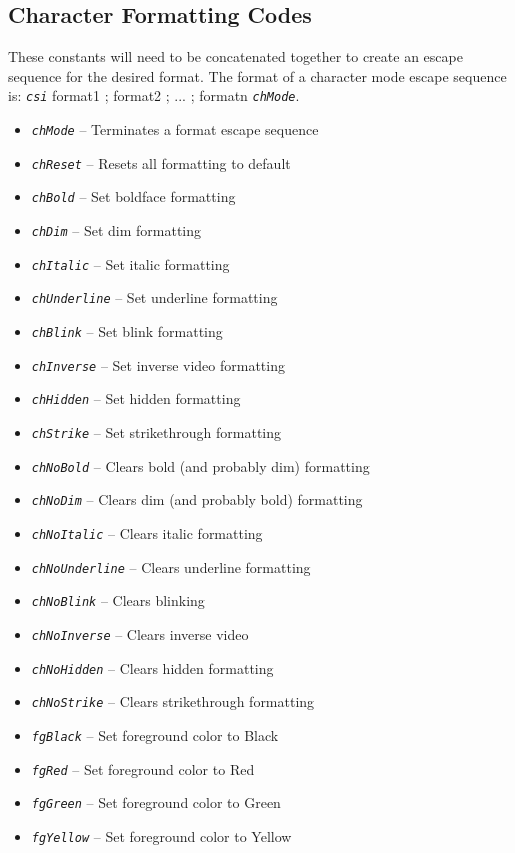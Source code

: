 \documentclass[10pt, openany]{book}
\newcommand{\constant}[1]{\emph{\texttt{#1}}}
\begin{document}
\subsection{Character Formatting Codes}
These constants will need to be concatenated together to create an escape sequence for the desired format.  The format of a character mode escape sequence is:
  \constant{csi} format1 ; format2 ; ... ; formatn \constant{chMode}.
  \begin{itemize}
    \item \constant{chMode} -- Terminates a format escape sequence
  \item \constant{chReset} -- Resets all formatting to default
  \item \constant{chBold} -- Set boldface formatting
  \item \constant{chDim} -- Set dim formatting
  \item \constant{chItalic} -- Set italic formatting
  \item \constant{chUnderline} -- Set underline formatting
  \item \constant{chBlink} -- Set blink formatting
  \item \constant{chInverse} -- Set inverse video formatting
  \item \constant{chHidden} -- Set hidden formatting
  \item \constant{chStrike} -- Set strikethrough formatting
  \item \constant{chNoBold} -- Clears bold (and probably dim) formatting
  \item \constant{chNoDim} -- Clears dim (and probably bold) formatting
  \item \constant{chNoItalic} -- Clears italic formatting
  \item \constant{chNoUnderline} -- Clears underline formatting
  \item \constant{chNoBlink} -- Clears blinking
  \item \constant{chNoInverse} -- Clears inverse video
  \item \constant{chNoHidden} -- Clears hidden formatting
  \item \constant{chNoStrike} -- Clears strikethrough formatting
  \item \constant{fgBlack} -- Set foreground color to Black
  \item \constant{fgRed} -- Set foreground color to Red
  \item \constant{fgGreen} -- Set foreground color to Green
  \item \constant{fgYellow} -- Set foreground color to Yellow

\end{itemize}
\end{document}
